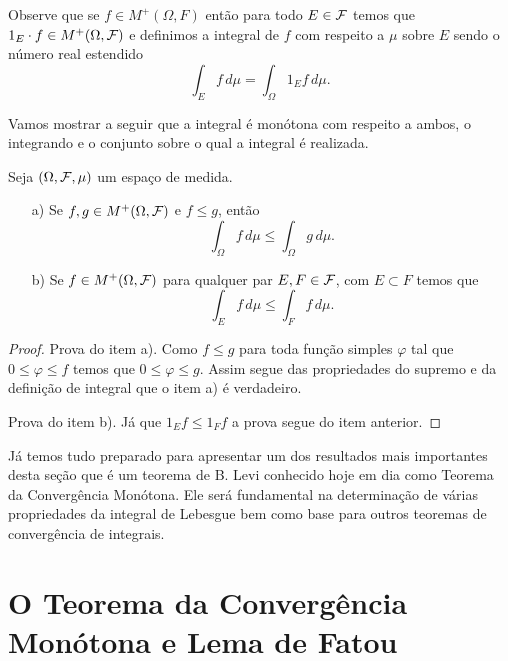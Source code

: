 Observe que se $f\in M^{+}(\Omega,F)$ então para
todo $E\in\mathcal{F}$ temos que $1_E\cdot f\in M^{+}(\Omega,\mathcal{F})$
e definimos a integral de $f$ com respeito a $\mu$ 
sobre $E$ sendo o número real estendido 
	\[
		\int_{E} f\, d\mu
		=
		\int_{\Omega} 1_{E}f\, d\mu.
	\]

Vamos mostrar a seguir que a integral é monótona 
com respeito a ambos, o integrando e o conjunto
sobre o qual a integral é realizada.






\begin{lema}
\label{lema-monotonicidade-integral-funcao-nao-negativas}
Seja $(\Omega,\mathcal{F},\mu)$ um espaço de medida.
\begin{itemize}
	\item[a)]
	Se $f,g\in M^{+}(\Omega,\mathcal{F})$	 e $f\leq g$, então 
		\[
			\int_{\Omega} f\, d\mu
			\leq
			\int_{\Omega} g\, d\mu.
		\]
	
	\item[b)] 
	Se $f\in M^{+}(\Omega,\mathcal{F})$ para 
	qualquer par $E,F\in \mathcal{F}$, com 
	$E\subset F$ temos que 
		\[
			\int_{E} f\, d\mu
			\leq
			\int_{F} f\, d\mu.
		\]
	 
\end{itemize}
\end{lema}





\begin{proof}
Prova do item a). 
Como $f\leq g$ para toda função simples $\varphi$ 
tal que $0\leq \varphi\leq f$ temos que $0\leq \varphi\leq g$.
Assim segue das propriedades do supremo e da definição de 
integral que o item a) é verdadeiro.

Prova do item b). Já que $1_{E}f\leq 1_{F}f$
a prova segue do item anterior.
\end{proof}

\bigskip

Já temos tudo preparado para apresentar um dos resultados
mais importantes desta seção que é um teorema de B. Levi 
conhecido hoje em dia como Teorema da Convergência Monótona.
Ele será fundamental na determinação de várias propriedades
da integral de Lebesgue bem como base para outros teoremas 
de convergência de integrais. 








\section{O Teorema da Convergência Monótona e Lema de Fatou}


